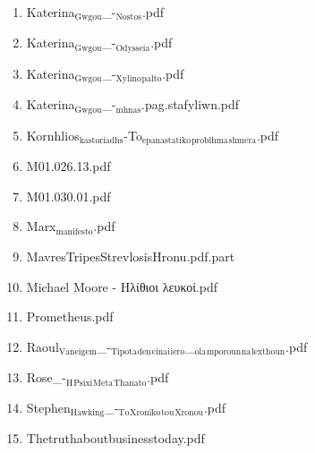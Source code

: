 \documentclass[11pt]{article}
\begin{document}
\begin{enumerate}
\begin{enumerate}
\item Katerina$_{\text{Gwgou}}$\_-$_{\text{Nostos}}$.pdf
\label{sec-1-1-1-1-49-2-2-1-26}

\item Katerina$_{\text{Gwgou}}$\_-$_{\text{Odysseia}}$.pdf
\label{sec-1-1-1-1-49-2-2-1-27}

\item Katerina$_{\text{Gwgou}}$\_-$_{\text{Xylino}}$$_{\text{palto}}$.pdf
\label{sec-1-1-1-1-49-2-2-1-28}

\item Katerina$_{\text{Gwgou}}$\_-$_{\text{mhnas}}$.pag.stafyliwn.pdf
\label{sec-1-1-1-1-49-2-2-1-29}

\item Kornhlios$_{\text{kastoriadhs}}$-To$_{\text{epanastatiko}}$$_{\text{problhma}}$$_{\text{shmera}}$.pdf
\label{sec-1-1-1-1-49-2-2-1-30}

\item M01.026.13.pdf
\label{sec-1-1-1-1-49-2-2-1-31}

\item M01.030.01.pdf
\label{sec-1-1-1-1-49-2-2-1-32}

\item Marx$_{\text{manifesto}}$.pdf
\label{sec-1-1-1-1-49-2-2-1-33}

\item MavresTripesStrevlosisHronu.pdf.part
\label{sec-1-1-1-1-49-2-2-1-34}

\item Michael Moore - Ηλίθιοι λευκοί.pdf
\label{sec-1-1-1-1-49-2-2-1-35}

\item Prometheus.pdf
\label{sec-1-1-1-1-49-2-2-1-36}

\item Raoul$_{\text{Vaneigem}}$\_-$_{\text{Tipota}}$$_{\text{den}}$$_{\text{einai}}$$_{\text{iero}}$\_$_{\text{ola}}$$_{\text{mporoun}}$$_{\text{na}}$$_{\text{lexthoun}}$.pdf
\label{sec-1-1-1-1-49-2-2-1-37}

\item Rose\_-$_{\text{H}}$$_{\text{Psixi}}$$_{\text{Meta}}$$_{\text{Thanato}}$.pdf
\label{sec-1-1-1-1-49-2-2-1-38}

\item Stephen$_{\text{Hawking}}$\_-$_{\text{To}}$$_{\text{Xroniko}}$$_{\text{tou}}$$_{\text{Xronou}}$.pdf
\label{sec-1-1-1-1-49-2-2-1-39}

\item Thetruthaboutbusinesstoday.pdf
\label{sec-1-1-1-1-49-2-2-1-40}


\end{enumerate}
\end{enumerate}
\end{document}
